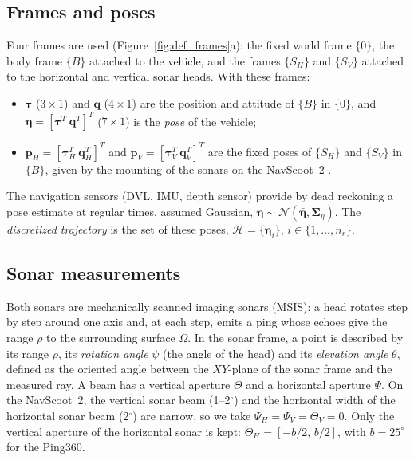 \subsection{Frames and poses}            %
\label{sec:def_frames}                   %

Four frames are used (Figure~\ref{fig:def_frames}a): the fixed world frame $\{0\}$, the body frame
$\{B\}$ attached to the vehicle, and the frames $\{S_H\}$ and $\{S_V\}$ attached to the horizontal
and vertical sonar heads. With these frames:
\begin{itemize}                          %
  \item $\boldsymbol{\tau}$ ($3\times1$) and $\mathbf{q}$ ($4\times1$) are the position and attitude of
        $\{B\}$ in $\{0\}$, and $\boldsymbol{\eta} = [\boldsymbol{\tau}^T\ \mathbf{q}^T]^T$ ($7\times1$)
        is the \emph{pose} of the vehicle;
  \item $\mathbf{p}_H = [\boldsymbol{\tau}_H^T\ \mathbf{q}_H^T]^T$ and
        $\mathbf{p}_V = [\boldsymbol{\tau}_V^T\ \mathbf{q}_V^T]^T$ are the fixed poses of $\{S_H\}$ and
        $\{S_V\}$ in $\{B\}$, given by the mounting of the sonars on the NavScoot~2
        \citep{margaritis2025internship}.
\end{itemize}
The navigation sensors (DVL, IMU, depth sensor) provide by dead reckoning a pose estimate at regular
times, assumed Gaussian, $\boldsymbol{\eta} \sim \mathcal{N}(\bar{\boldsymbol{\eta}},
\boldsymbol{\Sigma}_{\eta})$. The \emph{discretized trajectory} is the set of these poses,
$\mathcal{H} = \{\boldsymbol{\eta}_i\}$, $i \in \{1,\dots,n_r\}$.

\subsection{Sonar measurements}          %
\label{sec:def_measurements}             %

Both sonars are mechanically scanned imaging sonars (MSIS): a head rotates step by step around one
axis and, at each step, emits a ping whose echoes give the range $\rho$ to the surrounding surface
$\Omega$. In the sonar frame, a point is described by its range $\rho$, its \emph{rotation angle}
$\psi$ (the angle of the head) and its \emph{elevation angle} $\theta$, defined as the oriented angle
between the $XY$-plane of the sonar frame and the measured ray. A beam has a vertical aperture
$\Theta$ and a horizontal aperture $\Psi$. On the NavScoot~2, the vertical sonar beam
(1--2$^\circ$) and the horizontal width of the horizontal sonar beam (2$^\circ$) are narrow, so
we take $\Psi_H = \Psi_V = \Theta_V = 0$. Only the vertical aperture of the horizontal sonar
is kept: $\Theta_H = [-b/2,\, b/2]$, with $b = 25^\circ$ for the Ping360.

